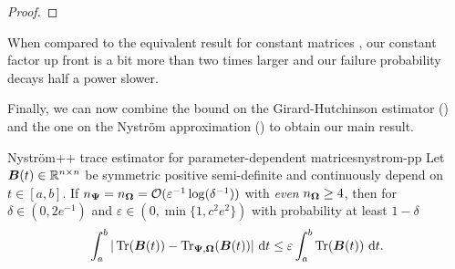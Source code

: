 \begin{proof}
\end{proof}

\color{black}


When compared to the equivalent result for constant matrices \cite[Lemma 3.2]{persson-2022-improved-variants}, our constant factor up front is a bit more than two times larger and our failure probability decays half a power slower.
 
Finally, we can now combine the bound on the Girard-Hutchinson estimator () and the one on the Nyström approximation () to obtain our main result.

\begin{theorem}{Nyström++ trace estimator for parameter-dependent matrices}{nystrom-pp}
    Let $\boldsymbol{B}(t) \in \mathbb{R}^{n \times n}$ be symmetric positive semi-definite and continuously depend on $t \in [a, b]$. If $n_{\boldsymbol{\Psi}} = n_{\boldsymbol{\Omega}} = \mathcal{O}(\varepsilon^{-1} \log(\delta^{-1}))$ with \emph{even} $n_{\boldsymbol{\Omega}} \geq 4$, then for $\delta \in (0, 2e^{-1})$ and $\varepsilon \in (0, \min\{1, c^2e^2\})$ with probability at least $1 - \delta$ 
    \begin{equation}
        \int_{a}^{b} | \operatorname{Tr}(\boldsymbol{B}(t)) - \operatorname{Tr}_{\boldsymbol{\Psi}, \boldsymbol{\Omega}}(\boldsymbol{B}(t)) |~\mathrm{d}t
        \leq \varepsilon \int_{a}^{b} \operatorname{Tr}(\boldsymbol{B}(t))~\mathrm{d}t.
    \end{equation}
\end{theorem}


